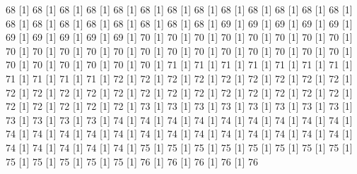 \documentclass[12pt]{article}
\begin{document}
\begin{Schunk}
\begin{Soutput}
[1] 68%
[1] 68%
[1] 68%
[1] 68%
[1] 68%
[1] 68%
[1] 68%
[1] 68%
[1] 68%
[1] 68%
[1] 68%
[1] 68%
[1] 68%
[1] 68%
[1] 68%
[1] 68%
[1] 68%
[1] 68%
[1] 68%
[1] 68%
[1] 68%
[1] 69%
[1] 69%
[1] 69%
[1] 69%
[1] 69%
[1] 69%
[1] 69%
[1] 69%
[1] 69%
[1] 69%
[1] 70%
[1] 70%
[1] 70%
[1] 70%
[1] 70%
[1] 70%
[1] 70%
[1] 70%
[1] 70%
[1] 70%
[1] 70%
[1] 70%
[1] 70%
[1] 70%
[1] 70%
[1] 70%
[1] 70%
[1] 70%
[1] 70%
[1] 70%
[1] 70%
[1] 70%
[1] 70%
[1] 70%
[1] 70%
[1] 70%
[1] 70%
[1] 71%
[1] 71%
[1] 71%
[1] 71%
[1] 71%
[1] 71%
[1] 71%
[1] 71%
[1] 71%
[1] 71%
[1] 71%
[1] 72%
[1] 72%
[1] 72%
[1] 72%
[1] 72%
[1] 72%
[1] 72%
[1] 72%
[1] 72%
[1] 72%
[1] 72%
[1] 72%
[1] 72%
[1] 72%
[1] 72%
[1] 72%
[1] 72%
[1] 72%
[1] 72%
[1] 72%
[1] 72%
[1] 72%
[1] 72%
[1] 72%
[1] 72%
[1] 72%
[1] 72%
[1] 73%
[1] 73%
[1] 73%
[1] 73%
[1] 73%
[1] 73%
[1] 73%
[1] 73%
[1] 73%
[1] 73%
[1] 73%
[1] 73%
[1] 74%
[1] 74%
[1] 74%
[1] 74%
[1] 74%
[1] 74%
[1] 74%
[1] 74%
[1] 74%
[1] 74%
[1] 74%
[1] 74%
[1] 74%
[1] 74%
[1] 74%
[1] 74%
[1] 74%
[1] 74%
[1] 74%
[1] 74%
[1] 74%
[1] 74%
[1] 74%
[1] 74%
[1] 74%
[1] 74%
[1] 74%
[1] 75%
[1] 75%
[1] 75%
[1] 75%
[1] 75%
[1] 75%
[1] 75%
[1] 75%
[1] 75%
[1] 75%
[1] 75%
[1] 75%
[1] 75%
[1] 76%
[1] 76%
[1] 76%
[1] 76%
[1] 76%

\end{Soutput}
\end{Schunk}
\end{document}
